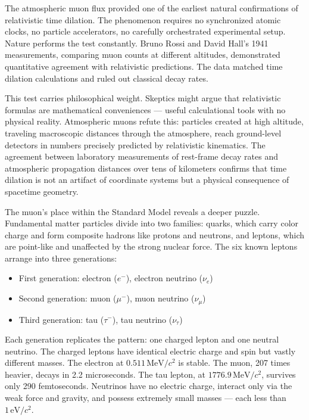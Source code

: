 The atmospheric muon flux provided one of the earliest natural confirmations of relativistic time dilation. The phenomenon requires no synchronized atomic clocks, no particle accelerators, no carefully orchestrated experimental setup. Nature performs the test constantly. Bruno Rossi and David Hall's 1941 measurements, comparing muon counts at different altitudes, demonstrated quantitative agreement with relativistic predictions. The data matched time dilation calculations and ruled out classical decay rates.

This test carries philosophical weight. Skeptics might argue that relativistic formulas are mathematical conveniences — useful calculational tools with no physical reality. Atmospheric muons refute this: particles created at high altitude, traveling macroscopic distances through the atmosphere, reach ground-level detectors in numbers precisely predicted by relativistic kinematics. The agreement between laboratory measurements of rest-frame decay rates and atmospheric propagation distances over tens of kilometers confirms that time dilation is not an artifact of coordinate systems but a physical consequence of spacetime geometry.

The muon's place within the Standard Model reveals a deeper puzzle. Fundamental matter particles divide into two families: quarks, which carry color charge and form composite hadrons like protons and neutrons, and leptons, which are point-like and unaffected by the strong nuclear force. The six known leptons arrange into three generations:
\begin{itemize}
\item First generation: electron ($e^-$), electron neutrino ($\nu_e$)
\item Second generation: muon ($\mu^-$), muon neutrino ($\nu_\mu$)
\item Third generation: tau ($\tau^-$), tau neutrino ($\nu_\tau$)
\end{itemize}

Each generation replicates the pattern: one charged lepton and one neutral neutrino. The charged leptons have identical electric charge and spin but vastly different masses. The electron at $0.511\,\text{MeV}/c^2$ is stable. The muon, 207 times heavier, decays in 2.2 microseconds. The tau lepton, at $1776.9\,\text{MeV}/c^2$, survives only 290 femtoseconds. Neutrinos have no electric charge, interact only via the weak force and gravity, and possess extremely small masses — each less than $1\,\text{eV}/c^2$.

